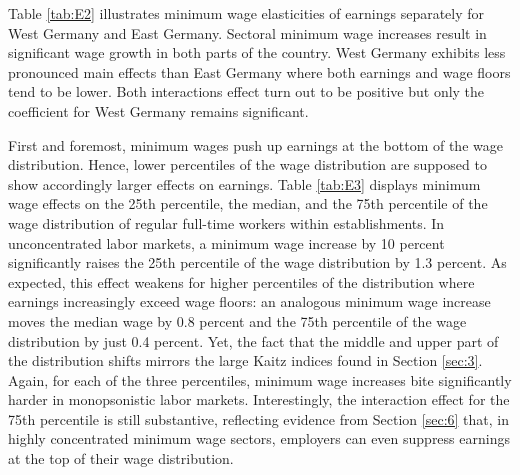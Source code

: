 \documentclass[11pt,oneside,reqno,xcolor=dvipsnames]{article} %
\begin{document}
Table \ref{tab:E2} illustrates minimum wage elasticities of earnings separately for West Germany and East Germany. Sectoral minimum wage increases result in significant wage growth in both parts of the country. West Germany exhibits less pronounced main effects than East Germany where both earnings and wage floors tend to be lower. Both interactions effect turn out to be positive but only the coefficient for West Germany remains significant.

First and foremost, minimum wages push up earnings at the bottom of the wage distribution. Hence, lower percentiles of the wage distribution are supposed to show accordingly larger effects on earnings. Table \ref{tab:E3} displays minimum wage effects on the 25th percentile, the median, and the 75th percentile of the wage distribution of regular full-time workers within establishments. In unconcentrated labor markets, a minimum wage increase by 10 percent significantly raises the 25th percentile of the wage distribution by 1.3 percent. As expected, this effect weakens for higher percentiles of the distribution where earnings increasingly exceed wage floors: an analogous minimum wage increase moves the median wage by 0.8 percent and the 75th percentile of the wage distribution by just 0.4 percent. Yet, the fact that the middle and upper part of the distribution shifts mirrors the large Kaitz indices found in Section \ref{sec:3}. Again, for each of the three percentiles, minimum wage increases bite significantly harder in monopsonistic labor markets. Interestingly, the interaction effect for the 75th percentile is still substantive, reflecting evidence from Section \ref{sec:6} that, in highly concentrated minimum wage sectors, employers can even suppress earnings at the top of their wage distribution.
\end{document}
